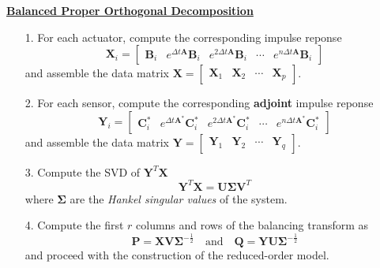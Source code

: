 \documentclass[aspectratio=169, usenames, dvipsnames]{beamer}
\begin{document}
\begin{frame}
  \vfill

  \centering
  \underline{\textbf{Balanced Proper Orthogonal Decomposition}}

  \vfill
  \begin{overprint}
    \begin{enumerate}
      \item[1.] For each actuator, compute the corresponding impulse reponse
      \[
      \bm{X}_i
      =
      \begin{bmatrix}
        \bm{B}_i & e^{\Delta t \bm{A}} \bm{B}_i & e^{2\Delta t \bm{A}} \bm{B}_i & \cdots & e^{n \Delta t \bm{A}} \bm{B}_i
      \end{bmatrix}
      \]
      and assemble the data matrix $\bm{X} = \begin{bmatrix} \bm{X}_1 & \bm{X}_2 & \cdots & \bm{X}_p \end{bmatrix}$.
    \end{enumerate}

    \begin{enumerate}
      \item[2.] For each sensor, compute the corresponding \textbf{adjoint} impulse reponse
      \[
      \bm{Y}_i
      =
      \begin{bmatrix}
        \bm{C}^*_i & e^{\Delta t \bm{A}^*} \bm{C}^*_i & e^{2\Delta t \bm{A}^*} \bm{C}^*_i & \cdots & e^{n \Delta t \bm{A}^*} \bm{C}_i^*
      \end{bmatrix}
      \]
      and assemble the data matrix $\bm{Y} = \begin{bmatrix} \bm{Y}_1 & \bm{Y}_2 & \cdots & \bm{Y}_q \end{bmatrix}$.
    \end{enumerate}

    \begin{enumerate}
      \item[3.] Compute the SVD of $\bm{Y}^T \bm{X}$
      \[
      \bm{Y}^T \bm{X} = \bm{U} \boldsymbol{\Sigma} \bm{V}^T
      \]
      where $\boldsymbol{\Sigma}$ are the \emph{Hankel singular values} of the system.
    \end{enumerate}

    \begin{enumerate}
      \item[4.] Compute the first $r$ columns and rows of the balancing transform as
      \[
      \bm{P} = \bm{X} \bm{V} \boldsymbol{\Sigma}^{-\frac12} \quad \text{and} \quad \bm{Q} = \bm{Y} \bm{U} \boldsymbol{\Sigma}^{-\frac12}
      \]
      and proceed with the construction of the reduced-order model.
    \end{enumerate}

  \end{overprint}

  \vfill
\end{frame}
\end{document}
